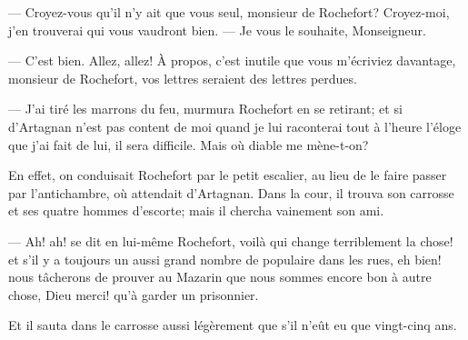 — Croyez-vous qu'il n'y ait que vous seul, monsieur de Rochefort? Croyez-moi, j'en trouverai qui vous vaudront bien.
— Je vous le souhaite, Monseigneur.

— C'est bien. Allez, allez! À propos, c'est inutile que vous m'écriviez davantage, monsieur de Rochefort, vos lettres seraient des lettres perdues.

— J'ai tiré les marrons du feu, murmura Rochefort en se retirant; et si d'Artagnan n'est pas content de moi quand je lui raconterai tout à l'heure l'éloge que j'ai fait de lui, il sera difficile. Mais où diable me mène-t-on?

En effet, on conduisait Rochefort par le petit escalier, au lieu de le faire passer par l'antichambre, où attendait d'Artagnan. Dans la cour, il trouva son carrosse et ses quatre hommes d'escorte; mais il chercha vainement son ami.

— Ah! ah! se dit en lui-même Rochefort, voilà qui change terriblement la chose! et s'il y a toujours un aussi grand nombre de populaire dans les rues, eh bien! nous tâcherons de prouver au Mazarin que nous sommes encore bon à autre chose, Dieu merci! qu'à garder un prisonnier.

Et il sauta dans le carrosse aussi légèrement que s'il n'eût eu que vingt-cinq ans.